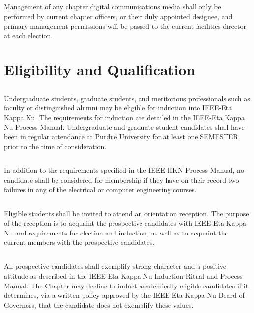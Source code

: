 \documentclass[10pt, oneside]{article}
\begin{document}
\subsection{}
Management of any chapter digital communications media shall only be performed by current chapter officers, or their duly appointed designee, and primary management permissions will be passed to the current facilities director at each election.

\section{Eligibility and Qualification}
\subsection{}
Undergraduate students, graduate students, and meritorious professionals such as faculty or distinguished alumni may be eligible for induction into IEEE-Eta Kappa Nu. The requirements for induction are detailed in the IEEE-Eta Kappa Nu Process Manual.
Undergraduate and graduate student candidates shall have been in regular attendance at Purdue University for at least one SEMESTER prior to the time of consideration.
\subsection{}
In addition to the requirements specified in the IEEE-HKN Process Manual, no candidate shall be considered for membership if they have on their record two failures in any of the electrical or computer engineering courses.

\subsection{}
Eligible students shall be invited to attend an orientation reception. The purpose of the reception is to acquaint the prospective candidates with IEEE-Eta Kappa Nu and requirements for election and induction, as well as to acquaint the current members with the prospective candidates.
\subsection{}
All prospective candidates shall exemplify strong character and a positive attitude as described in the IEEE-Eta Kappa Nu Induction Ritual and Process Manual. The Chapter may decline to induct academically eligible candidates if it determines, via a written policy approved by the IEEE-Eta Kappa Nu Board of Governors, that the candidate does not exemplify these values.
\end{document}
